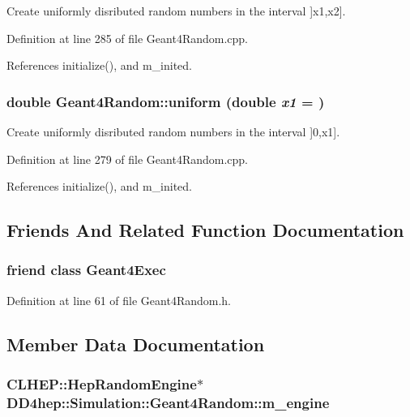 Create uniformly disributed random numbers in the interval \mbox{]}x1,x2\mbox{]}. 

Definition at line 285 of file Geant4Random.cpp.

References initialize(), and m\_\-inited.\hypertarget{class_d_d4hep_1_1_simulation_1_1_geant4_random_af0c23cab921aa21e6707eae5091aba15}{
\subsubsection[{uniform}]{\setlength{\rightskip}{0pt plus 5cm}double Geant4Random::uniform (double {\em x1} = {})}}
\label{class_d_d4hep_1_1_simulation_1_1_geant4_random_af0c23cab921aa21e6707eae5091aba15}


Create uniformly disributed random numbers in the interval \mbox{]}0,x1\mbox{]}. 

Definition at line 279 of file Geant4Random.cpp.

References initialize(), and m\_\-inited.

\subsection{Friends And Related Function Documentation}
\hypertarget{class_d_d4hep_1_1_simulation_1_1_geant4_random_ac0f82c2b468e2eec2341f3740273273a}{
\subsubsection[{Geant4Exec}]{\setlength{\rightskip}{0pt plus 5cm}friend class {\bf Geant4Exec}}}
\label{class_d_d4hep_1_1_simulation_1_1_geant4_random_ac0f82c2b468e2eec2341f3740273273a}


Definition at line 61 of file Geant4Random.h.

\subsection{Member Data Documentation}
\hypertarget{class_d_d4hep_1_1_simulation_1_1_geant4_random_aad17696c3d6d9f9953a40e75d8125da6}{
\subsubsection[{m\_\-engine}]{\setlength{\rightskip}{0pt plus 5cm}CLHEP::HepRandomEngine$\ast$ {\bf DD4hep::Simulation::Geant4Random::m\_\-engine}}}
\label{class_d_d4hep_1_1_simulation_1_1_geant4_random_aad17696c3d6d9f9953a40e75d8125da6}


